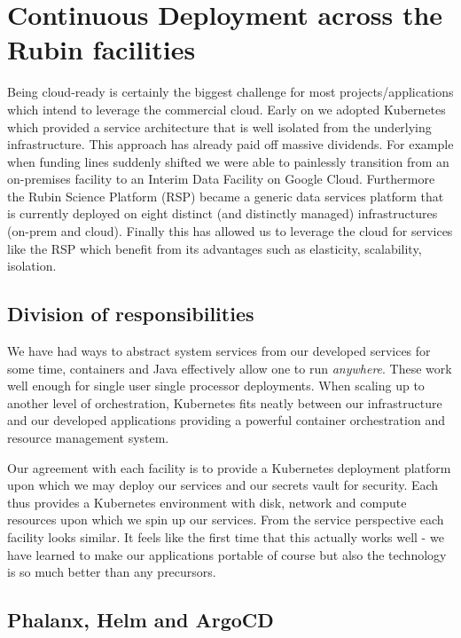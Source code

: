 \section{Continuous Deployment across the Rubin facilities} \label{sec:deploy}

Being cloud-ready is certainly the biggest challenge for most projects/applications which intend to leverage the commercial cloud.
Early on we adopted Kubernetes which provided a service architecture that is well isolated from the underlying infrastructure.
This approach has already paid off massive dividends.
For example when funding lines suddenly shifted we were able to painlessly transition from an on-premises facility to an Interim Data Facility on Google Cloud.
Furthermore the Rubin Science Platform (RSP) became a generic data services platform that is currently deployed on eight distinct (and distinctly managed) infrastructures (on-prem and cloud).
Finally this has allowed us to leverage the cloud for services like the RSP which benefit from its advantages such as elasticity, scalability, isolation.




\subsection{Division of responsibilities}
We have had ways to abstract system services from our developed services for some time, containers and Java effectively allow one to run \emph{anywhere}.
These work well enough for single user single processor deployments.
When scaling up to another level of orchestration, Kubernetes fits neatly between our infrastructure and our developed applications providing a powerful container orchestration and resource management system.

Our agreement with each facility is to provide a Kubernetes deployment platform upon which we may deploy our services and our secrets vault for security.
Each thus provides a Kubernetes environment with disk, network and compute resources upon which we spin up our services.
From the service perspective each facility looks similar.
It feels like the first time that this actually works well - we have learned to make our applications portable of course but also the technology is so much better than any precursors.

\subsection{Phalanx, Helm and ArgoCD}

